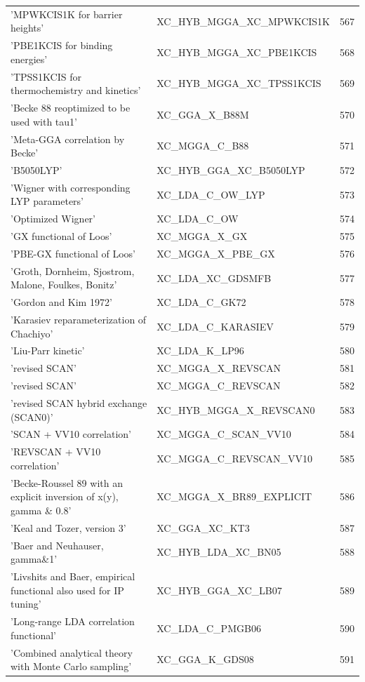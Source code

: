 \documentclass[final,12pt]{article}
\begin{document}
{{{{{{\begin{table}[!h]
\begin{center}
\begin{tabular}{llr}
  'MPWKCIS1K for barrier heights' & XC\_HYB\_MGGA\_XC\_MPWKCIS1K  &567\\
  'PBE1KCIS for binding energies' & XC\_HYB\_MGGA\_XC\_PBE1KCIS  &568\\
  'TPSS1KCIS for thermochemistry and kinetics' & XC\_HYB\_MGGA\_XC\_TPSS1KCIS  &569\\
  'Becke 88 reoptimized to be used with tau1' & XC\_GGA\_X\_B88M  &570\\
  'Meta-GGA correlation by Becke' & XC\_MGGA\_C\_B88  &571\\
  'B5050LYP' & XC\_HYB\_GGA\_XC\_B5050LYP  &572\\
  'Wigner with corresponding LYP parameters' & XC\_LDA\_C\_OW\_LYP  &573\\
  'Optimized Wigner' & XC\_LDA\_C\_OW  &574\\
  'GX functional of Loos' & XC\_MGGA\_X\_GX  &575\\
  'PBE-GX functional of Loos' & XC\_MGGA\_X\_PBE\_GX  &576\\
  'Groth, Dornheim, Sjostrom, Malone, Foulkes, Bonitz' & XC\_LDA\_XC\_GDSMFB  &577\\
  'Gordon and Kim 1972' & XC\_LDA\_C\_GK72  &578\\
  'Karasiev reparameterization of Chachiyo' & XC\_LDA\_C\_KARASIEV  &579\\
  'Liu-Parr kinetic' & XC\_LDA\_K\_LP96  &580\\
  'revised SCAN' & XC\_MGGA\_X\_REVSCAN  &581\\
  'revised SCAN' & XC\_MGGA\_C\_REVSCAN  &582\\
  'revised SCAN hybrid exchange (SCAN0)' & XC\_HYB\_MGGA\_X\_REVSCAN0  &583\\
  'SCAN + VV10 correlation' & XC\_MGGA\_C\_SCAN\_VV10  &584\\
  'REVSCAN + VV10 correlation' & XC\_MGGA\_C\_REVSCAN\_VV10  &585\\
  'Becke-Roussel 89 with an explicit inversion of x(y), gamma \& 0.8' & XC\_MGGA\_X\_BR89\_EXPLICIT  &586\\
  'Keal and Tozer, version 3' & XC\_GGA\_XC\_KT3  &587\\
  'Baer and Neuhauser, gamma\&1' & XC\_HYB\_LDA\_XC\_BN05  &588\\
  'Livshits and Baer, empirical functional also used for IP tuning' & XC\_HYB\_GGA\_XC\_LB07  &589\\
  'Long-range LDA correlation functional' & XC\_LDA\_C\_PMGB06  &590\\
  'Combined analytical theory with Monte Carlo sampling' & XC\_GGA\_K\_GDS08  &591\\

\end{tabular}
\end{center}
\end{table}}}}}}}
\end{document}
